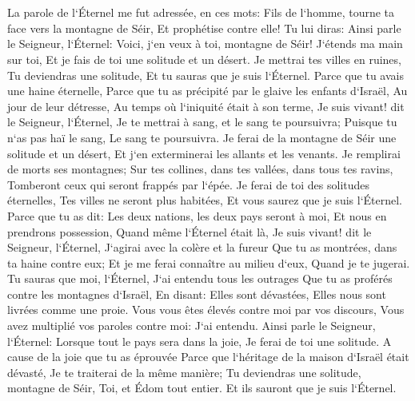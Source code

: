 \chapter{}

\verse La parole de l`Éternel me fut adressée, en ces mots: 
\verse Fils de l`homme, tourne ta face vers la montagne de Séir, Et prophétise contre elle! 
\verse Tu lui diras: Ainsi parle le Seigneur, l`Éternel: Voici, j`en veux à toi, montagne de Séir! J`étends ma main sur toi, Et je fais de toi une solitude et un désert. 
\verse Je mettrai tes villes en ruines, Tu deviendras une solitude, Et tu sauras que je suis l`Éternel. 
\verse Parce que tu avais une haine éternelle, Parce que tu as précipité par le glaive les enfants d`Israël, Au jour de leur détresse, Au temps où l`iniquité était à son terme, 
\verse Je suis vivant! dit le Seigneur, l`Éternel, Je te mettrai à sang, et le sang te poursuivra; Puisque tu n`as pas haï le sang, Le sang te poursuivra. 
\verse Je ferai de la montagne de Séir une solitude et un désert, Et j`en exterminerai les allants et les venants. 
\verse Je remplirai de morts ses montagnes; Sur tes collines, dans tes vallées, dans tous tes ravins, Tomberont ceux qui seront frappés par l`épée. 
\verse Je ferai de toi des solitudes éternelles, Tes villes ne seront plus habitées, Et vous saurez que je suis l`Éternel. 
\verse Parce que tu as dit: Les deux nations, les deux pays seront à moi, Et nous en prendrons possession, Quand même l`Éternel était là, 
\verse Je suis vivant! dit le Seigneur, l`Éternel, J`agirai avec la colère et la fureur Que tu as montrées, dans ta haine contre eux; Et je me ferai connaître au milieu d`eux, Quand je te jugerai. 
\verse Tu sauras que moi, l`Éternel, J`ai entendu tous les outrages Que tu as proférés contre les montagnes d`Israël, En disant: Elles sont dévastées, Elles nous sont livrées comme une proie. 
\verse Vous vous êtes élevés contre moi par vos discours, Vous avez multiplié vos paroles contre moi: J`ai entendu. 
\verse Ainsi parle le Seigneur, l`Éternel: Lorsque tout le pays sera dans la joie, Je ferai de toi une solitude. 
\verse A cause de la joie que tu as éprouvée Parce que l`héritage de la maison d`Israël était dévasté, Je te traiterai de la même manière; Tu deviendras une solitude, montagne de Séir, Toi, et Édom tout entier. Et ils sauront que je suis l`Éternel. 

\chapter{}

